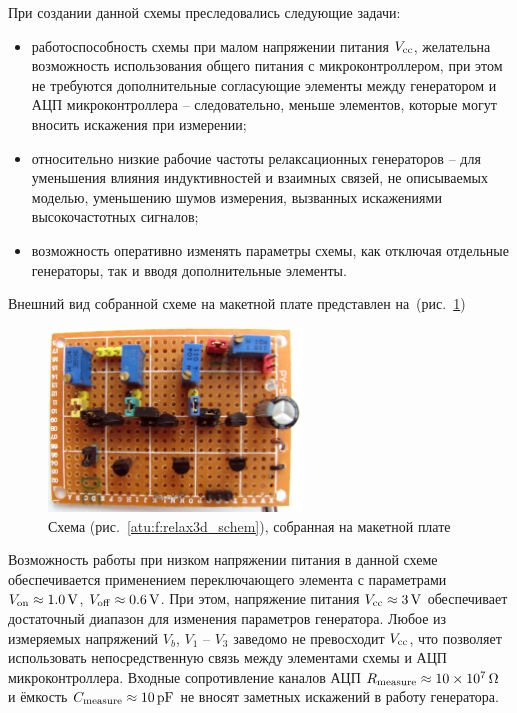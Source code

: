 При создании данной схемы преследовались следующие задачи:
\begin{itemize}

  \item
    работоспособность схемы при малом напряжении питания $V_\mathrm{cc}$,
    желательна возможность использования общего питания с микроконтроллером,
    при этом не требуются дополнительные согласующие элементы
    между генератором и АЦП микроконтроллера -- следовательно,
    меньше элементов, которые могут вносить искажения при измерении;

  \item
    относительно низкие рабочие частоты релаксационных генераторов --
    для уменьшения влияния индуктивностей и взаимных связей, не описываемых моделью,
    уменьшению шумов измерения, вызванных искажениями высокочастотных сигналов;

  \item
    возможность оперативно изменять параметры схемы, как отключая отдельные генераторы,
    так и вводя дополнительные элементы.

\end{itemize}

Внешний вид собранной схеме на макетной плате представлен на~(рис.~\ref{atu:f:relax3d_board})

\begin{figure}[htb!]
  \centerline{\includegraphics[width=0.6\textwidth]{p/relax3d_board.jpg} }
  \caption{Схема (рис.~\ref{atu:f:relax3d_schem}), собранная на макетной плате}
  \label{atu:f:relax3d_board}
\end{figure}

Возможность работы при низком напряжении питания в данной схеме обеспечивается
применением переключающего элемента с параметрами
$V_\mathrm{on} \approx \SI{1.0}{\volt}$,
$V_\mathrm{off} \approx \SI{0.6}{\volt}$.
При этом, напряжение питания $V_\mathrm{cc} \approx \SI{3}{\volt}$
обеспечивает достаточный диапазон для изменения параметров генератора.
Любое из измеряемых напряжений $V_b$, $V_1$ -- $V_3$
заведомо не превосходит $V_\mathrm{cc}$,
что позволяет использовать непосредственную связь
между элементами схемы и АЦП микроконтроллера.
Входные сопротивление каналов АЦП $R_\mathrm{measure} \approx \SI{10e7}{\ohm}$
и ёмкость $C\Tidx{measure} \approx \SI{10}{\pico\farad} $
не вносят заметных искажений в работу генератора.

